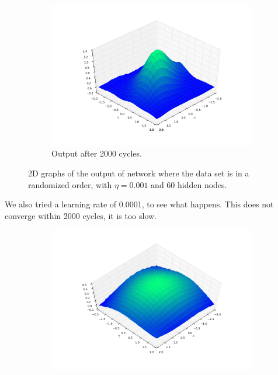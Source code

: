 \documentclass[a4paper,10pt]{article}
\numberwithin{equation}{section} %
\numberwithin{figure}{section} %
\numberwithin{table}{section} %
\theoremstyle{mytheor}
\begin{document}
\begin{enumerate}
\begin{figure}[h!]
\begin{subfigure}[b]{0.45\textwidth}
				\includegraphics[width=\textwidth]{plot/ex2_6_2000.png}\vspace{-0.5cm}
				\caption{Output after 2000 cycles.}
			\end{subfigure}
   			\caption{\vspace{-0.1cm} 2D graphs of the output of network where the data set is in a randomized order, with $\eta = 0.001$ and 60 hidden nodes.}\vspace{-0.2cm}
  		\end{figure}
		We also tried a learning rate of 0.0001, to see what happens. This does not converge within 2000 cycles, it is too slow. 
		\begin{figure}[h!]
			\centering
			\begin{subfigure}[b]{0.45\textwidth}
				\includegraphics[width=\textwidth]{plot/ex2_6_alt50.png}\vspace{-0.5cm}

\end{subfigure}
\end{figure}
\end{enumerate}
\end{document}
